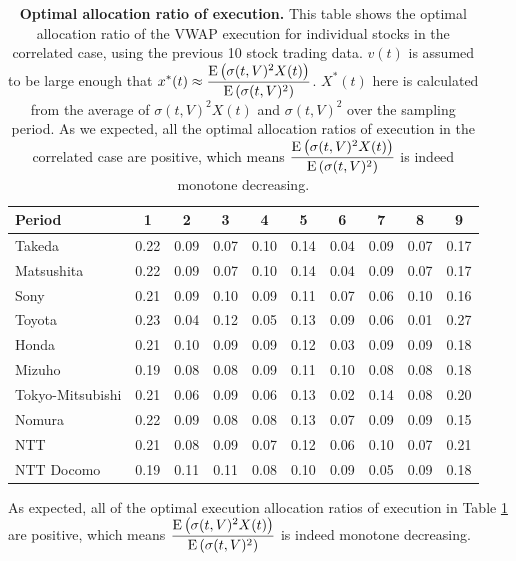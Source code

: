 \begin{table}[htbp]
\begin{center}
\begin{tabular}{|l|ccccccccc|} \hline
 Period & 1 & 2 & 3 & 4 & 5 & 6 & 7 & 8 & 9 \\ \hline
 Takeda & 0.22 & 0.09 & 0.07 & 0.10 & 0.14 & 0.04 & 0.09 & 0.07 & 0.17 \\
 Matsushita & 0.22 & 0.09 & 0.07 & 0.10 & 0.14 & 0.04 & 0.09 & 0.07 & 0.17 \\
 Sony & 0.21 & 0.09 & 0.10 & 0.09 & 0.11 & 0.07 & 0.06 & 0.10 & 0.16 \\
 Toyota & 0.23 & 0.04 & 0.12 & 0.05 & 0.13 & 0.09 & 0.06 & 0.01 & 0.27 \\
 Honda & 0.21 & 0.10 & 0.09 & 0.09 & 0.12 & 0.03 & 0.09 & 0.09 & 0.18 \\
 Mizuho & 0.19 & 0.08 & 0.08 & 0.09 & 0.11 & 0.10 & 0.08 & 0.08 & 0.18 \\
 Tokyo-Mitsubishi & 0.21 & 0.06 & 0.09 & 0.06 & 0.13 & 0.02 & 0.14 & 0.08 & 0.20 \\
 Nomura & 0.22 & 0.09 & 0.08 & 0.08 & 0.13 & 0.07 & 0.09 & 0.09 & 0.15 \\
 NTT & 0.21 & 0.08 & 0.09 & 0.07 & 0.12 & 0.06 & 0.10 & 0.07 & 0.21 \\
 NTT Docomo & 0.19 & 0.11 & 0.11 & 0.08 & 0.10 & 0.09 & 0.05 & 0.09 & 0.18 \\ \hline
\end{tabular}
\end{center}
\caption[Optimal allocation ratio of execution]{{\bf Optimal allocation ratio of execution.} \quad This table shows the optimal allocation ratio of the VWAP execution for individual stocks in the correlated case, using the previous 10 stock trading data.
  $v(t)$ is assumed to be large enough that ${\displaystyle x^*(t) \approx
\frac{{\mathrm{E}}\left( \sigma(t,V)^2 X(t) \right)}{{\mathrm{E}}\left( \sigma(t,V)^2 \right)}}$.
 $X^*(t)$ here is calculated from the average of $\sigma(t,V)^2 X(t)$ and $\sigma(t,V)^2$ over the sampling period.
 As we expected, all the optimal allocation ratios of execution in the correlated case are positive, which means
${\displaystyle \frac{{\mathrm{E}}\left( \sigma(t,V)^2 X(t) \right)}{{\mathrm{E}}\left( \sigma(t,V)^2 \right)}}$ is indeed monotone decreasing.}\label{table_s1}
\end{table}

As expected, all of the optimal execution allocation ratios of execution in Table \ref{table_s1} are positive, which means $\displaystyle \frac{{\mathrm{E}}\left( \sigma(t,V)^2X(t) \right)}{{\mathrm{E}}\left( \sigma(t,V)^2 \right)}$ is indeed monotone decreasing.

